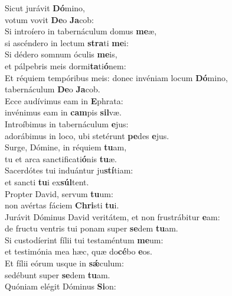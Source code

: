 \evenverse Sicut jurávit \textbf{Dó}mino,~\*\\
\evenverse votum vovit \textbf{De}o \textbf{Ja}cob:\\
\oddverse Si introíero in tabernáculum domus \textbf{me}æ,~\*\\
\oddverse si ascéndero in lectum \textbf{stra}ti \textbf{me}i:\\
\evenverse Si dédero somnum óculis \textbf{me}is,~\*\\
\evenverse et pálpebris meis dormi\textbf{ta}ti\textbf{ó}nem:\\
\oddverse Et réquiem tempóribus meis: donec invéniam locum \textbf{Dó}mino,~\*\\
\oddverse tabernáculum \textbf{De}o \textbf{Ja}cob.\\
\evenverse Ecce audívimus eam in \textbf{E}phrata:~\*\\
\evenverse invénimus eam in \textbf{cam}pis \textbf{sil}væ.\\
\oddverse Introíbimus in tabernáculum \textbf{e}jus:~\*\\
\oddverse adorábimus in loco, ubi stetérunt \textbf{pe}des \textbf{e}jus.\\
\evenverse Surge, Dómine, in réquiem \textbf{tu}am,~\*\\
\evenverse tu et arca sanctificati\textbf{ó}nis \textbf{tu}æ.\\
\oddverse Sacerdótes tui induántur ju\textbf{stí}tiam:~\*\\
\oddverse et sancti \textbf{tu}i ex\textbf{súl}tent.\\
\evenverse Propter David, servum \textbf{tu}um:~\*\\
\evenverse non avértas fáciem \textbf{Chri}sti \textbf{tu}i.\\
\oddverse Jurávit Dóminus David veritátem, et non frustrábitur \textbf{e}am:~\*\\
\oddverse de fructu ventris tui ponam super \textbf{se}dem \textbf{tu}am.\\
\evenverse Si custodíerint fílii tui testaméntum \textbf{me}um:~\*\\
\evenverse et testimónia mea hæc, quæ do\textbf{cé}bo \textbf{e}os.\\
\oddverse Et fílii eórum usque in \textbf{sǽ}culum:~\*\\
\oddverse sedébunt super \textbf{se}dem \textbf{tu}am.\\
\evenverse Quóniam elégit Dóminus \textbf{Si}on:~\*\\
